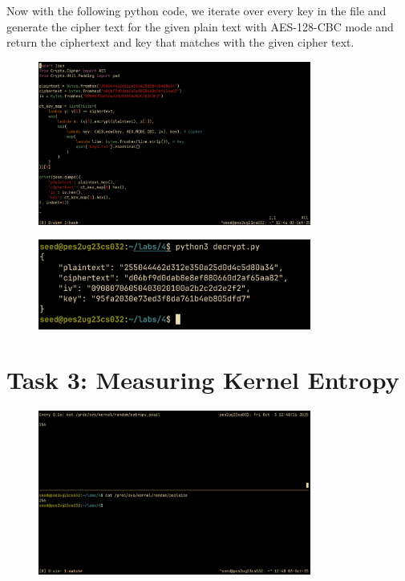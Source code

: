 \documentclass[12pt,a4paper]{article}
\begin{document}
Now with the following python code, we iterate over every key in the file and generate the cipher text for the given plain text with AES-128-CBC mode and return the ciphertext and key that matches with the given cipher text.

\begin{figure}[H]
    \centering
    \includegraphics[width=0.8\textwidth]{./images/task2-4.png} 
\end{figure}

\begin{figure}[H]
    \centering
    \includegraphics[width=0.8\textwidth]{./images/task2-5.png} 
\end{figure}

\pagebreak

\section{Task 3: Measuring Kernel Entropy}

\begin{figure}[H]
    \centering
    \includegraphics[width=0.8\textwidth]{./images/task3.png} 
\end{figure}
\end{document}
